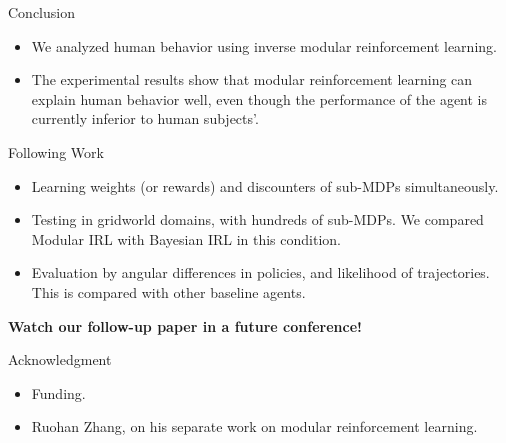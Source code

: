 \documentclass[final]{beamer}
\begin{document}
\begin{frame}{}
\begin{textblock}{37}
\begin{block}{Conclusion}
\begin{itemize}
\item
We analyzed human behavior using inverse modular reinforcement learning.
\item
The experimental results show that modular reinforcement learning can explain
human behavior well, even though the performance of the agent is currently
inferior to human subjects'.
\end{itemize}
\end{block}

\begin{block}{Following Work}
\begin{itemize}
\item
Learning weights (or rewards) and discounters of sub-MDPs simultaneously.
\item
Testing in gridworld domains, with hundreds of sub-MDPs. We compared Modular IRL
with Bayesian IRL in this condition.
\item
Evaluation by angular differences in policies, and likelihood of trajectories.
This is compared with other baseline agents.
\end{itemize}

{\bf Watch our follow-up paper in a future conference!}
\end{block}

\begin{block}{Acknowledgment}
\begin{itemize}
\item Funding.
\item Ruohan Zhang, on his separate work on modular reinforcement learning.
\end{itemize}
\end{block}

\end{textblock}

\end{frame}
\end{document}
